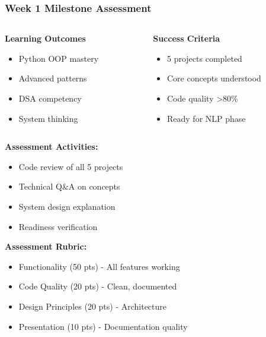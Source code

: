 \begin{frame}[fragile]\frametitle{Week 1 Milestone Assessment}
\begin{columns}
    \begin{column}[T]{0.5\linewidth}
      \textbf{Learning Outcomes}
      \begin{itemize}
        \item Python OOP mastery
        \item Advanced patterns
        \item DSA competency
        \item System thinking
      \end{itemize}
    \end{column}
    \begin{column}[T]{0.5\linewidth}
      \textbf{Success Criteria}
      \begin{itemize}
        \item 5 projects completed
        \item Core concepts understood
        \item Code quality >80\%
        \item Ready for NLP phase
      \end{itemize}
    \end{column}
  \end{columns}
  
  \vspace{0.3cm}
  \textbf{Assessment Activities:}
  \begin{itemize}
    \item Code review of all 5 projects
    \item Technical Q\&A on concepts
    \item System design explanation
    \item Readiness verification
  \end{itemize}
  
\vspace{0.3cm}
\textbf{Assessment Rubric:}
\begin{itemize}
  \item Functionality (50 pts) - All features working
  \item Code Quality (20 pts) - Clean, documented
  \item Design Principles (20 pts) - Architecture
  \item Presentation (10 pts) - Documentation quality
\end{itemize}  
\end{frame}

